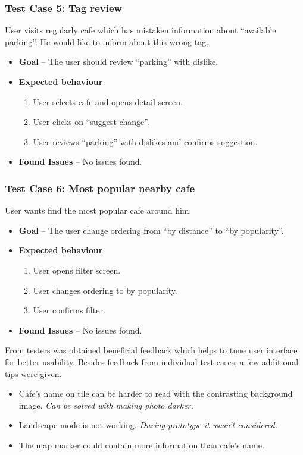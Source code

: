 \subsubsection{Test Case 5: Tag review}
User visits regularly cafe which has mistaken information about ``available parking''. He would like to inform about this wrong tag. 
\begin{itemize}
    \item \textbf{Goal} -- The user should review ``parking'' with dislike. 
    \item \textbf{Expected behaviour}
    \begin{enumerate}
        \item User selects cafe and opens detail screen.
        \item User clicks on ``suggest change''.
        \item User reviews ``parking'' with dislikes and confirms suggestion. 
    \end{enumerate}
    \item \textbf{Found Issues} -- No issues found.
\end{itemize}

\subsubsection{Test Case 6: Most popular nearby cafe}
User wants find the most popular cafe around him. 
\begin{itemize}
    \item \textbf{Goal} -- The user change ordering from ``by distance'' to ``by popularity''.
    \item \textbf{Expected behaviour}
    \begin{enumerate}
        \item User opens filter screen.
        \item User changes ordering to by popularity.
        \item User confirms filter.
    \end{enumerate}
    \item \textbf{Found Issues} -- No issues found.
\end{itemize}

From testers was obtained beneficial feedback which helps to tune user interface for better usability. Besides feedback from individual test cases, a few additional tips were given.

\begin{itemize}
    \item Cafe's name on tile can be harder to read with the contrasting background image. \textit{Can be solved with making photo darker.}
    \item Landscape mode is not working. \textit{During prototype it wasn't considered.}
    \item The map marker could contain more information than cafe's name.
\end{itemize}

